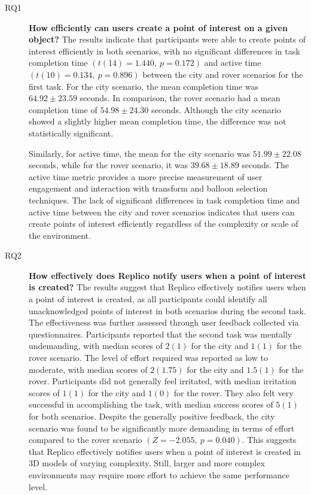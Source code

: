         \begin{description}
            \item[RQ1] \textbf{How efficiently can users create a point of interest on a given object?} The results indicate that participants were able to create points of interest efficiently in both scenarios, with no significant differences in task completion time $\left(t(14) = 1.440,\ p = 0.172\right)$ and active time $\left(t(10) = 0.134,\ p = 0.896\right)$ between the city and rover scenarios for the first task. For the city scenario, the mean completion time was $64.92 \pm 23.59$ seconds. In comparison, the rover scenario had a mean completion time of $54.98 \pm 24.30$ seconds. Although the city scenario showed a slightly higher mean completion time, the difference was not statistically significant. 

            Similarly, for active time, the mean for the city scenario was $51.99 \pm 22.08$ seconds, while for the rover scenario, it was $39.68 \pm 18.89$ seconds. The active time metric provides a more precise measurement of user engagement and interaction with transform and balloon selection techniques. The lack of significant differences in task completion time and active time between the city and rover scenarios indicates that users can create points of interest efficiently regardless of the complexity or scale of the environment.

            \item[RQ2] \textbf{How effectively does Replico notify users when a point of interest is created?} The results suggest that Replico effectively notifies users when a point of interest is created, as all participants could identify all unacknowledged points of interest in both scenarios during the second task. The effectiveness was further assessed through user feedback collected via questionnaires. Participants reported that the second task was mentally undemanding, with median scores of $2 (1)$ for the city and $1 (1)$ for the rover scenario. The level of effort required was reported as low to moderate, with median scores of $2 (1.75)$ for the city and $1.5 (1)$ for the rover. Participants did not generally feel irritated, with median irritation scores of $1 (1)$ for the city and $1 (0)$ for the rover. They also felt very successful in accomplishing the task, with median success scores of $5 (1)$ for both scenarios. Despite the generally positive feedback, the city scenario was found to be significantly more demanding in terms of effort compared to the rover scenario $\left(Z = -2.055,\ p = 0.040\right)$. This suggests that Replico effectively notifies users when a point of interest is created in 3D models of varying complexity. Still, larger and more complex environments may require more effort to achieve the same performance level.


\end{description}
